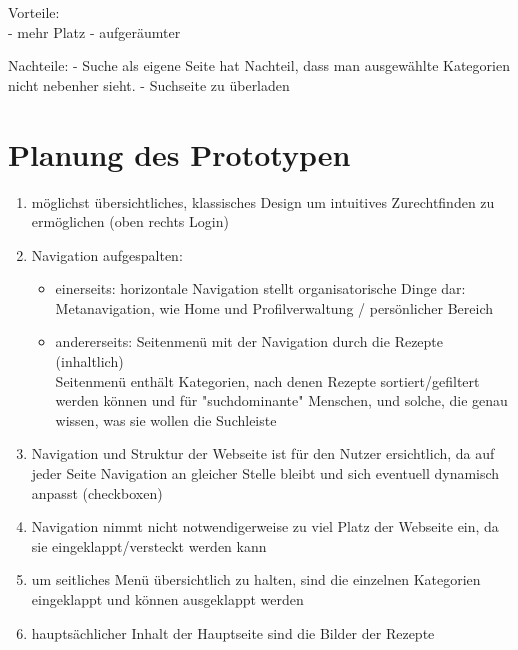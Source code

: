 \documentclass[parskip,10pt,abstracton]{scrartcl}
\begin{document}
Vorteile: \\
- mehr Platz
- aufgeräumter

Nachteile:
- Suche als eigene Seite hat Nachteil, dass man ausgewählte Kategorien nicht nebenher sieht.
- Suchseite zu überladen



\section*{Planung des Prototypen}

\begin{enumerate}
 \item möglichst übersichtliches, klassisches Design um intuitives Zurechtfinden zu ermöglichen (oben rechts Login)
 \item Navigation aufgespalten:
 \begin{itemize}
  \item einerseits: horizontale Navigation stellt organisatorische Dinge dar: Metanavigation, wie Home und Profilverwaltung / persönlicher Bereich
  \item andererseits: Seitenmenü mit der Navigation durch die Rezepte (inhaltlich) \\
  Seitenmenü enthält Kategorien, nach denen Rezepte sortiert/gefiltert werden können und für "suchdominante" Menschen, und solche, die genau wissen, was sie wollen die Suchleiste
 \end{itemize}
 \item Navigation und Struktur der Webseite ist für den Nutzer ersichtlich, da auf jeder Seite Navigation an gleicher Stelle bleibt und sich eventuell dynamisch anpasst (checkboxen)
 \item Navigation nimmt nicht notwendigerweise zu viel Platz der Webseite ein, da sie eingeklappt/versteckt werden kann
 \item um seitliches Menü übersichtlich zu halten, sind die einzelnen Kategorien eingeklappt und können ausgeklappt werden
 
 \item hauptsächlicher Inhalt der Hauptseite sind die Bilder der Rezepte

\end{enumerate}
\end{document}
